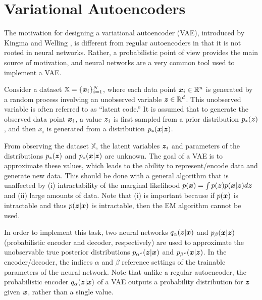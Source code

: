 \section{Variational Autoencoders}


The motivation for designing a variational autoencoder (VAE), introduced by Kingma and Welling \cite{kingma2014}, is different from regular autoencoders in that it is not rooted in neural networks. Rather, a probabilistic point of view provides the main source of motivation, and neural networks are a very common tool used to implement a VAE.

Consider a dataset $\mathbb{X} = \{\boldsymbol{x}_i\}_{i=1}^N$, where each data point $\boldsymbol{x}_i \in \mathbb{R}^n$ is generated by a random process involving an unobserved variable $\boldsymbol{z} \in \mathbb{R}^d$. This unobserved variable is often referred to as ``latent code.'' It is assumed that to generate the observed data point $\boldsymbol{x}_i$, a value $\boldsymbol{z}_i$ is first sampled from a prior distribution $p_*(\boldsymbol{z})$, and then $x_i$ is generated from a distribution $p_*(\boldsymbol{x} | \boldsymbol{z})$.

From observing the dataset $\mathbb{X}$, the latent variables $\boldsymbol{z}_i$ and parameters of the distributions $p_*(\boldsymbol{z})$ and $p_*(\boldsymbol{x} | \boldsymbol{z})$ are unknown. The goal of a VAE is to approximate these values, which leads to the ability to represent/encode data and generate new data. This should be done with a general algorithm that is unaffected by (i) intractability of the marginal likelihood $p(\boldsymbol{x}) = \int p(\boldsymbol{z}) p(\boldsymbol{x} | \boldsymbol{z}) d\boldsymbol{z}$ and (ii) large amounts of data.  Note that (i) is important because if $p(\boldsymbol{x})$ is intractable and thus $p(\boldsymbol{z} | \boldsymbol{x})$ is intractable, then the EM algorithm cannot be used.

In order to implement this task, two neural networks $q_\alpha(\boldsymbol{z} | \boldsymbol{x})$ and $p_\beta(\boldsymbol{x} | \boldsymbol{z})$ (probabilistic encoder and decoder, respectively) are used to approximate the unobservable true posterior distributions $p_{\alpha^*}(\boldsymbol{z}| \boldsymbol{x})$ and $p_{\beta^*}(\boldsymbol{x} | \boldsymbol{z})$. In the encoder/decoder, the indices $\alpha$ and $\beta$ reference settings of the trainable parameters of the neural network. Note that unlike a regular autoencoder, the probabilistic encoder $q_\alpha(\boldsymbol{z} | \boldsymbol{x})$ of a VAE outputs a probability distribution for $\boldsymbol{z}$ given $\boldsymbol{x}$, rather than a single value.

